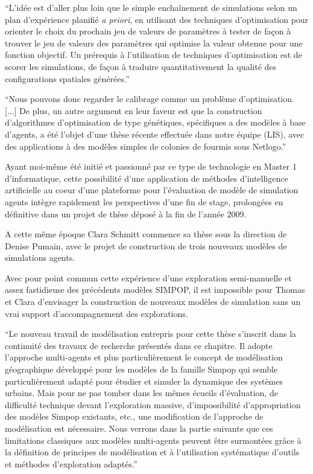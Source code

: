 \enquote{L’idée est d’aller plus loin que le simple enchaînement de simulations selon un plan d’expérience planifié \textit{a priori}, en utilisant des techniques d’optimisation pour orienter le choix
du prochain jeu de valeurs de paramètres à tester de façon à trouver le jeu de valeurs des paramètres qui optimise la valeur obtenue pour une fonction objectif. Un prérequis à l’utilisation de techniques d’optimisation est de scorer les simulations, de façon à traduire quantitativement la qualité des configurations spatiales générées.}

\enquote{Nous pouvons donc regarder le calibrage comme un problème d’optimisation. [...] De plus, un autre argument en leur faveur est que la construction d’algorithmes d’optimisation de type génétiques, spécifiques a des modèles à base d’agents, a été l’objet d’une thèse récente effectuée dans notre équipe (LIS), avec des applications à des modèles simples de colonies de fourmis sous Netlogo.}

Ayant moi-même été initié et passionné par ce type de technologie en Master 1 d'informatique, cette possibilité d'une application de méthodes d'intelligence artificielle au coeur d'une plateforme pour l'évaluation de modèle de simulation agents intègre rapidement les perspectives d'une fin de stage, prolongées en définitive dans un projet de thèse déposé à la fin de l'année 2009.

A cette même époque Clara Schmitt commence sa thèse sous la direction de Denise Pumain, avec le projet de construction de trois nouveaux modèles de simulations agents.

Avec pour point commun cette expérience d'une exploration semi-manuelle et assez fastidieuse des précédents modèles SIMPOP, il est impossible pour Thomas et Clara d'envisager la construction de nouveaux modèles de simulation sans un vrai support d'accompagnement des explorations.

\enquote{Le nouveau travail de modélisation entrepris pour cette thèse s’inscrit dans la continuité des travaux de recherche présentés dans ce chapitre. Il adopte l’approche multi-agents et plus particulièrement le concept de modélisation géographique développé pour les modèles de la famille Simpop qui semble particulièrement adapté pour étudier et simuler la dynamique des systèmes urbains. Mais pour ne pas tomber dans les mêmes écueils d’évaluation, de difficulté technique devant l’exploration massive, d’impossibilité d’appropriation des modèles Simpop existants, etc., une modification de l’approche de modélisation est nécessaire. Nous verrons dans la partie suivante que ces limitations classiques aux modèles multi-agents peuvent être surmontées grâce à la définition de principes de modélisation et à l’utilisation systématique d’outils et méthodes d’exploration adaptés.} \autocite[113]{Schmitt2014}

